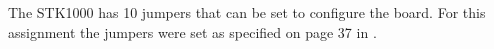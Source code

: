 The STK1000 has 10 jumpers that can be set to configure the board.
For this assignment the jumpers were set as specified on page 37 in \cite{lab-compendium}.
